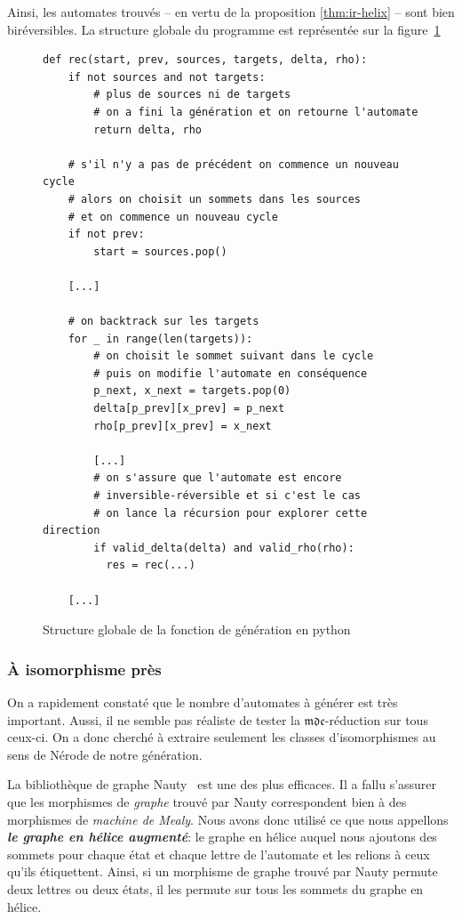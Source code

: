 \documentclass[11pt,a4paper]{article}
\begin{document}
Ainsi, les automates trouvés -- en vertu de la proposition \ref{thm:ir-helix} -- sont bien biréversibles. La structure globale du programme est représentée sur la figure~\ref{fig:gen-pseudo-code}

\begin{figure}
\begin{verbatim}
def rec(start, prev, sources, targets, delta, rho):
    if not sources and not targets:
        # plus de sources ni de targets
        # on a fini la génération et on retourne l'automate
        return delta, rho

    # s'il n'y a pas de précédent on commence un nouveau cycle
    # alors on choisit un sommets dans les sources
    # et on commence un nouveau cycle
    if not prev:
        start = sources.pop()

    [...]

    # on backtrack sur les targets
    for _ in range(len(targets)):
        # on choisit le sommet suivant dans le cycle
        # puis on modifie l'automate en conséquence
        p_next, x_next = targets.pop(0)
        delta[p_prev][x_prev] = p_next
        rho[p_prev][x_prev] = x_next

        [...]
        # on s'assure que l'automate est encore
        # inversible-réversible et si c'est le cas
        # on lance la récursion pour explorer cette direction
        if valid_delta(delta) and valid_rho(rho):
          res = rec(...)

    [...]

\end{verbatim}
  \caption{Structure globale de la fonction de génération en python\label{fig:gen-pseudo-code}}
\end{figure}

\subsubsection*{À isomorphisme près}

On a rapidement constaté que le nombre d'automates à générer est très important. Aussi, il ne semble pas réaliste de tester la $\mathfrak{mdc}$-réduction sur tous ceux-ci. On a donc cherché à extraire seulement les classes d'isomorphismes au sens de Nérode de notre génération.

La bibliothèque de graphe \textrm{Nauty}~\cite{Nauty} est une des plus efficaces. Il a fallu s'assurer que les morphismes de \textit{graphe} trouvé par \textrm{Nauty} correspondent bien à des morphismes de \textit{machine de Mealy}. Nous avons donc utilisé ce que nous appellons \textit{\textbf{le graphe en hélice augmenté}}: le graphe en hélice auquel nous ajoutons des sommets pour chaque état et chaque lettre de l'automate et les relions à ceux qu'ils étiquettent. Ainsi, si un morphisme de graphe trouvé par Nauty permute deux lettres ou deux états, il les permute sur tous les sommets du graphe en hélice.
\end{document}
